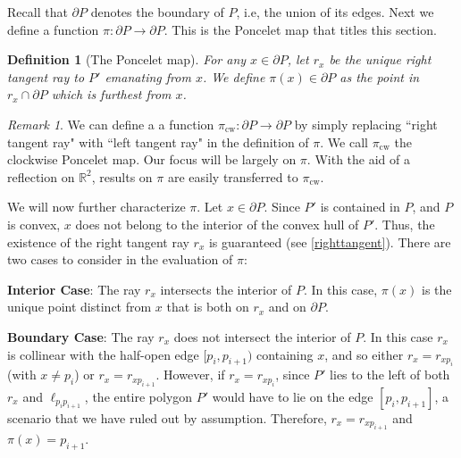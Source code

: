 \documentclass[11pt]{amsart}
\newtheorem{definition}[theorem]{Definition}
\theoremstyle{remark}
\newtheorem{remark}[theorem]{Remark}
\numberwithin{equation}{section}
\newcommand{\R}{\mathbb{R}}
\newcommand{\cw}{\mathrm{cw}}
\begin{document}
Recall that $\partial P$ denotes the boundary of $P$, i.e, the union of its edges. Next we define a function  $\pi\colon\partial P \to \partial P$. This is the Poncelet map that titles this section.

\begin{definition}[The Poncelet map]\label{ponceletdef}
For any $x\in \partial P$, let $r_x$ be the unique right tangent ray to $P'$ emanating from $x$. We define $\pi(x)\in\partial P$ as the point in  $r_x\cap \partial P$ which is furthest from $x$. 
\end{definition}

\begin{remark}
We can define a a function $\pi_{\cw}\colon \partial P\to \partial P$ by simply replacing ``right tangent ray" with ``left tangent ray" in the definition of $\pi$. We call $\pi_{\cw}$ the clockwise Poncelet map. Our focus will be largely on $\pi$. With the aid of a reflection on $\R^2$, results on $\pi$ are easily transferred to $\pi_{\cw}$.  
\end{remark}


We will now further characterize $\pi$. Let $x\in \partial P$. Since $P'$ is contained in $P$, and $P$ is convex, $x$ does not belong to the interior of the convex hull of $P'$. Thus, the existence of the right tangent ray $r_x$ is guaranteed (see \ref{righttangent}). There are two cases to consider
in the evaluation of $\pi$: 


\noindent\textbf{Interior Case}: The ray $r_x$ intersects the interior of $P$. In this case, $\pi(x)$ is the unique 
point distinct from $x$ that is both on $r_x$ and on $\partial P$. 



\noindent\textbf{Boundary Case}:
The ray $r_x$ does not intersect the interior of $P$. In this case  $r_x$ is collinear with the half-open edge $[p_i, p_{i+1})$ containing $x$, and so either $r_x=r_{xp_i}$ (with $x\neq p_i$) or $r_x=r_{xp_{i+1}}$. However, if $r_x=r_{xp_i}$, since $P'$ lies to the left of both $r_x$ and $\ell_{p_ip_{i+1}}$, the entire polygon $P'$ would have to lie on the edge $[p_i, p_{i+1}]$, a scenario that we have ruled out by assumption. Therefore,  $r_x=r_{xp_{i+1}}$ and $\pi(x)=p_{i+1}$. 
\end{document}
